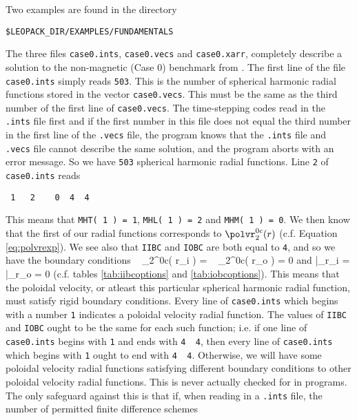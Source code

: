 Two examples are found in the directory
\begin{verbatim}
$LEOPACK_DIR/EXAMPLES/FUNDAMENTALS
\end{verbatim}
The three files
\verb+case0.ints+,
\verb+case0.vecs+ and
\verb+case0.xarr+, completely describe a solution
to the non-magnetic (Case 0) benchmark from \cite{bench}.
The first line of the file \verb+case0.ints+ simply
reads \verb+503+. This is the number of spherical
harmonic radial functions stored in the vector
\verb+case0.vecs+. This must be the same as the third
number of the first line of \verb+case0.vecs+.
The time-stepping codes read in the 
\verb+.ints+ file first and if the first number in this
file does not equal the third number in the first line
of the \verb+.vecs+ file, the program knows that
the \verb+.ints+ file and \verb+.vecs+ file cannot
describe the same solution, and the program aborts 
with an error message.
So we have \verb+503+ spherical harmonic radial functions.
Line \verb+2+ of \verb+case0.ints+ reads
\begin{verbatim}
 1   2    0  4  4
\end{verbatim}
This means that \verb+MHT( 1 ) = 1+,
\verb+MHL( 1 ) = 2+ and \verb+MHM( 1 ) = 0+.
We then know that the first of our radial functions
corresponds to $\polvr_{2}^{0c}( r )$ (c.f. Equation
\ref{eq:polvrexp}). We see also that \verb+IIBC+ and
\verb+IOBC+ are both equal to \verb+4+, and so we
have the boundary conditions
\beq
~ \polvr_{2}^{0c}( r_{\rm i} ) = ~ \polvr_{2}^{0c}( r_{\rm o} ) = 0
\eeq
and 
\beq
{} \biggl|_{r_{\rm i}} =
 \biggl|_{r_{\rm o}} = 0
\eeq
(c.f. tables \ref{tab:iibcoptions} and
\ref{tab:iobcoptions}).
This means that the poloidal velocity, or atleast
this particular spherical harmonic radial function,
must satisfy rigid boundary conditions.
Every line of \verb+case0.ints+ which begins with a number
\verb+1+ indicates a poloidal velocity radial function.
The values of \verb+IIBC+ and \verb+IOBC+ ought to be the
same for each such function; i.e. if one line of
\verb+case0.ints+ begins with \verb+1+ and ends with
\verb+4  4+, then every line of \verb+case0.ints+ which
begins with \verb+1+ ought to end with
\verb+4  4+. Otherwise, we will have some poloidal
velocity radial functions satisfying different boundary
conditions to other poloidal
velocity radial functions. This is never actually
checked for in programs. The only safeguard against this
is that if, when reading in a \verb+.ints+ file, the
number of permitted finite difference schemes
